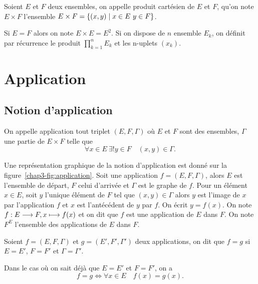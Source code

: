 \begin{defdef}
    Soient \(E\) et \(F\) deux ensembles, on appelle produit cartésien de \(E\) et 
    \(F\), qu'on note \(E \times F\) l'ensemble $E \times F = \left\{(x,y)\mathrel{}\middle|\mathrel{}x \in E 
    \ y \in F\right\}$.
\end{defdef}

Si \(E=F\) alors on note \(E \times E=E^2\). Si on dispose de \(n\) ensemble 
\(E_k\), on définit par récurrence le produit \(\prod_{k=1}^n E_k\) et les 
n-uplets \((x_k)\).

\section{Application}
\label{chap3-sec:applications}

\subsection{Notion d'application}
\label{chap3-subsec:notiondapplication}

\begin{defdef}
    On appelle application tout triplet \((E, F, \Gamma)\) où \(E\) et \(F\) sont 
    des ensembles, \(\Gamma\) une partie de \(E \times F\) telle que
    \begin{equation}
        \forall x \in E \ \exists! y \in F \quad (x,y) \in \Gamma.
    \end{equation}
\end{defdef}

Une représentation graphique de la notion d'application est donné sur la 
figure~\ref{chap3-fig:application}. Soit une application \(f=(E,F,\Gamma)\), 
alors \(E\) est l'ensemble de départ, \(F\) celui d'arrivée et \(\Gamma\) est le 
graphe de \(f\).
Pour un élément \(x \in E\), soit \(y\) l'unique élément de \(F\) tel que 
\((x,y) \in \Gamma\) alors \(y\) est l'image de \(x\) par l'application \(f\) et 
\(x\) est l'antécédent de \(y\) par \(f\). On écrit \(y=f(x)\). On note 
\(f:E \longrightarrow F, x \longmapsto f(x)\) et on dit que \(f\) est une application de 
\(E\) dans \(F\). On note \(F^E\) l'ensemble des applications de \(E\) dans 
\(F\).

\begin{defdef}
    Soient \(f=(E,F,\Gamma)\) et \(g=(E',F',\Gamma')\) deux applications, on dit que 
    \(f=g\) si \(E=E'\), \(F=F'\) et \(\Gamma=\Gamma'\).
\end{defdef}
Dans le cas où on sait déjà que \(E=E'\) et \(F=F'\), on a
\begin{equation}
    f=g \iff \forall x \in E \quad f(x)=g(x).
\end{equation}

